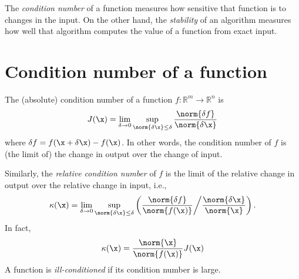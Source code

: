 \label{lab:conditioning_stability}



%

The \emph{condition number} of a function measures how sensitive that function is to changes in the input.
On the other hand, the \emph{stability} of an algorithm measures how well that algorithm computes the value of a function from exact input.

\section*{Condition number of a function}

The (absolute) condition number of a function $f: \mathbb{R}^m \rightarrow \mathbb{R}^n$ is
 \begin{equation}\label{equ:abs_cond}
J(\x) = \lim_{\delta \rightarrow 0} \sup_{\norm{\delta \x} \leq \delta} { \frac{\norm{\delta f}}{\norm{\delta \x}} }
\end{equation}
where $\delta f = f(\x+\delta\x)-f(\x)$.
In other words, the condition number of $f$ is (the limit of) the change in output over the change of input.

Similarly, the \emph{relative condition number} of $f$ is the limit of the relative change in output over the relative change in input, i.e.,
\begin{equation}\label{equ:rel_cond}
\kappa(\x) = \lim_{\delta \rightarrow 0} \sup_{\norm{\delta \x} \leq \delta} \left({ \frac{\norm{\delta f}}{\norm{f(\x)}} } \middle/ { \frac{\norm{\delta \x}}{\norm{\x}} }\right).
\end{equation}
In fact,
\[
\kappa(\x) = \frac{\norm{\x}}{\norm{f(\x)}} J(\x)
\]
A function is \emph{ill-conditioned} if its condition number is large.


